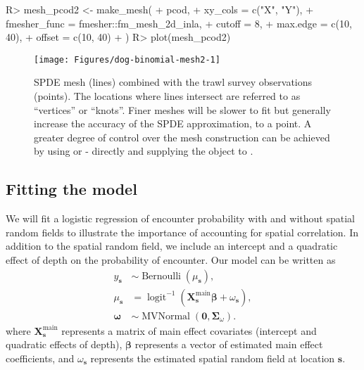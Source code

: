 \documentclass[article]{jss}\usepackage[]{graphicx}\usepackage[dvipsnames]{xcolor}
\newcommand{\s}{\bm{s}}
\begin{document}
\begin{Schunk}
\begin{Sinput}
R> mesh_pcod2 <- make_mesh(
+    pcod,
+    xy_cols = c("X", "Y"),
+    fmesher_func = fmesher::fm_mesh_2d_inla,
+    cutoff = 8,
+    max.edge = c(10, 40),
+    offset = c(10, 40)
+  )
R> plot(mesh_pcod2)
\end{Sinput}
\begin{figure}[ht]

{\centering \texttt{[image: Figures/dog-binomial-mesh2-1]}

}

\caption[SPDE mesh (lines) combined with the trawl survey observations (points)]{SPDE mesh (lines) combined with the trawl survey observations (points). The locations where lines intersect are referred to as ``vertices'' or ``knots''. Finer meshes will be slower to fit but generally increase the accuracy of the SPDE approximation, to a point. A greater degree of control over the mesh construction can be achieved by using  or - directly and supplying the object to .}\label{fig:dog-binomial-mesh2}
\end{figure}
\end{Schunk}

\subsection{Fitting the model}

We will fit a logistic regression of encounter probability with and without spatial random fields to illustrate the importance of accounting for spatial correlation.
In addition to the spatial random field, we include an intercept and a quadratic effect of depth on the probability of encounter.
Our model can be written as
\[
\begin{aligned}
y_{\bm{s}} &\sim \operatorname{Bernoulli} \left(\mu_{\bm{s}}\right),\\
\mu_{\bm{s}} &= \operatorname{logit}^{-1} \left( \bm{X}^{\mathrm{main}}_{\bm{s}} \bm{\beta} +
\omega_{\bm{s}} \right),\\
\boldsymbol{\omega} &\sim \operatorname{MVNormal}
  \left( \boldsymbol{0}, \boldsymbol{\Sigma}_\omega \right).
\end{aligned}
\]
where \(\bm{X}^{\mathrm{main}}_{\bm{s}}\) represents a matrix of main effect covariates (intercept and quadratic effects of depth), \(\bm{\beta}\) represents a vector of estimated main effect coefficients, and \(\omega_{\bm{s}}\) represents the estimated spatial random field at location $\s$.
\end{document}

